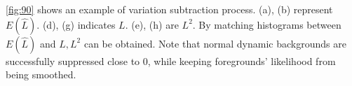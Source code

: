 \documentclass[conference]{IEEEtran}
\begin{document}
\ref{fig:90} shows an example of variation subtraction process. (a), (b) represent \begin{math} E(\hat{L}) \end{math}.
(d), (g) indicates \begin{math} L \end{math}. (e), (h) are \begin{math} L^2 \end{math}.
By matching histograms between \begin{math} E(\hat{L}) \end{math} and \begin{math} L, L^2 \end{math} can be obtained.
Note that normal dynamic backgrounds are successfully suppressed close to 0, while keeping foregrounds' likelihood from being smoothed.
\end{document}
